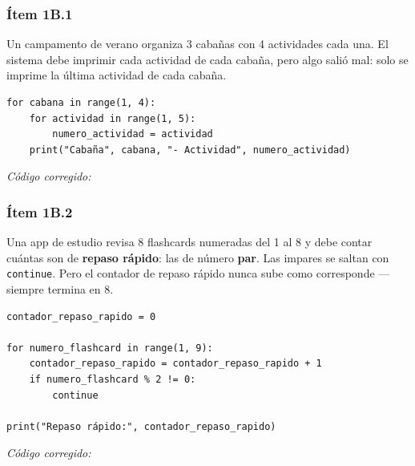 \documentclass[11pt]{article}
\begin{document}
\subsubsection*{Ítem 1B.1}
Un campamento de verano organiza 3 cabañas con 4 actividades cada una. El sistema debe imprimir cada actividad de cada cabaña, pero algo salió mal: solo se imprime la última actividad de cada cabaña.

\begin{cajacodigo}
\begin{Verbatim}[fontsize=\small]
for cabana in range(1, 4):
    for actividad in range(1, 5):
        numero_actividad = actividad
    print("Cabaña", cabana, "- Actividad", numero_actividad)
\end{Verbatim}
\end{cajacodigo}

\vspace{1mm}\textit{Código corregido:}
\begin{cajaescribe}[height=3.5cm]
\end{cajaescribe}

\subsubsection*{Ítem 1B.2}
Una app de estudio revisa 8 flashcards numeradas del 1 al 8 y debe contar cuántas son de \textbf{repaso rápido}: las de número \textbf{par}. Las impares se saltan con \texttt{continue}. Pero el contador de repaso rápido nunca sube como corresponde --- siempre termina en 8.

\begin{cajacodigo}
\begin{Verbatim}[fontsize=\small]
contador_repaso_rapido = 0

for numero_flashcard in range(1, 9):
    contador_repaso_rapido = contador_repaso_rapido + 1
    if numero_flashcard % 2 != 0:
        continue

print("Repaso rápido:", contador_repaso_rapido)
\end{Verbatim}
\end{cajacodigo}

\vspace{1mm}\textit{Código corregido:}
\begin{cajaescribe}[height=3.5cm]
\end{cajaescribe}
\end{document}
